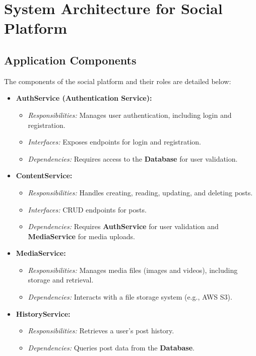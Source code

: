 \documentclass[a4paper,12pt]{article}
\begin{document}
\newpage
\section{System Architecture for Social Platform}

\subsection{Application Components}

The components of the social platform and their roles are detailed below:

\begin{itemize}
    \item \textbf{AuthService (Authentication Service):}
    \begin{itemize}
        \item \textit{Responsibilities:} Manages user authentication, including login and registration.
        \item \textit{Interfaces:} Exposes endpoints for login and registration.
        \item \textit{Dependencies:} Requires access to the \textbf{Database} for user validation.
    \end{itemize}
    
    \item \textbf{ContentService:}
    \begin{itemize}
        \item \textit{Responsibilities:} Handles creating, reading, updating, and deleting posts.
        \item \textit{Interfaces:} CRUD endpoints for posts.
        \item \textit{Dependencies:} Requires \textbf{AuthService} for user validation and \textbf{MediaService} for media uploads.
    \end{itemize}

    \item \textbf{MediaService:}
    \begin{itemize}
        \item \textit{Responsibilities:} Manages media files (images and videos), including storage and retrieval.
        \item \textit{Dependencies:} Interacts with a file storage system (e.g., AWS S3).
    \end{itemize}

    \item \textbf{HistoryService:}
    \begin{itemize}
        \item \textit{Responsibilities:} Retrieves a user's post history.
        \item \textit{Dependencies:} Queries post data from the \textbf{Database}.
    \end{itemize}


\end{itemize}
\end{document}
